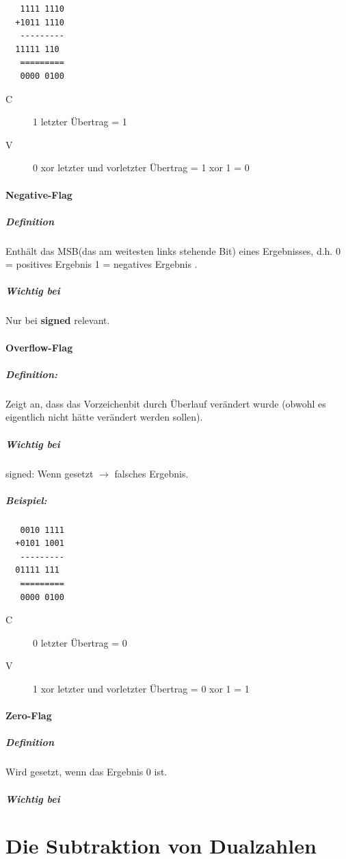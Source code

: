 \documentclass[12pt,a4paper]{scrartcl}
\begin{document}
\begin{lstlisting}
   1111 1110 
  +1011 1110 
   ---------
  11111 110  
   =========
   0000 0100
\end{lstlisting}

\begin{description}
\item[C] 1 letzter Übertrag = 1
\item[V] 0 xor letzter und vorletzter Übertrag = 1 xor 1 = 0
\end{description}

\paragraph*{Negative-Flag}
\subparagraph*{Definition} Enthält das MSB(das am weitesten links stehende Bit) eines Ergebnisses, d.h. 0 = positives Ergebnis 1 = negatives Ergebnis  .
\subparagraph*{Wichtig bei} Nur bei \textbf{signed} relevant.



\paragraph*{Overflow-Flag}
\subparagraph*{Definition:} Zeigt an, dass das Vorzeichenbit durch Überlauf verändert wurde (obwohl es eigentlich nicht hätte verändert werden sollen).
\subparagraph*{Wichtig bei} signed: Wenn gesetzt $\rightarrow$ falsches Ergebnis.
\subparagraph*{Beispiel:}

\begin{lstlisting}
   0010 1111 
  +0101 1001 
   ---------
  01111 111  
   =========
   0000 0100
\end{lstlisting}

\begin{description}
\item[C] 0 letzter Übertrag = 0
\item[V] 1 xor letzter und vorletzter Übertrag = 0 xor 1 = 1
\end{description}


\paragraph*{Zero-Flag}
\subparagraph*{Definition} Wird gesetzt, wenn das Ergebnis 0 ist. 
\subparagraph*{Wichtig bei} 


\section*{Die Subtraktion von Dualzahlen}
\end{document}
